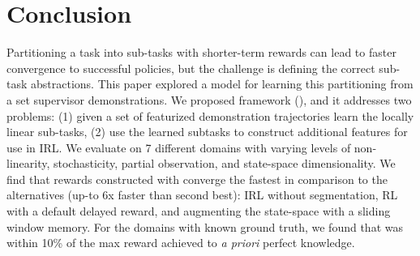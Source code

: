 \section{Conclusion}
Partitioning a task into sub-tasks with shorter-term rewards can lead to faster convergence to successful policies, but the challenge is defining the correct sub-task abstractions.
This paper explored a model for learning this partitioning from a set supervisor demonstrations.
We proposed framework \hirlfull (\hirl), and it addresses two problems: (1) given a set of featurized demonstration trajectories learn the locally linear sub-tasks, (2) use the learned subtasks to construct additional features for use in IRL.
We evaluate \hirl on 7 different domains with varying levels of non-linearity, stochasticity, partial observation, and state-space dimensionality.
We find that rewards constructed with \hirl converge the fastest in comparison to the alternatives (up-to $6$x faster than second best): IRL without segmentation, RL with a default delayed reward, and augmenting the state-space with a sliding window memory.
For the domains with known ground truth, we found that \hirl was within 10\% of the max reward achieved to \emph{a priori} perfect knowledge.
